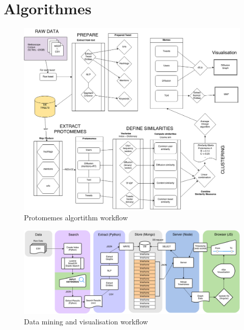 \section[Algorithmes]{Algorithmes}

\begin{landscape}
\begin{figure}
    \label{fig:ui-map}
    \centering
    \includegraphics[scale=0.45]{figures/annexes/Protomemesm_workflow.png}
    \caption{Protomemes algortithm workflow}
\end{figure}
\end{landscape}


\begin{landscape}
\begin{figure}
    \label{fig:ui-map}
    \centering
    \includegraphics[scale=0.59]{figures/annexes/UI_mitras.png}
    \caption{Data mining and visualisation workflow}
\end{figure}
\end{landscape}

